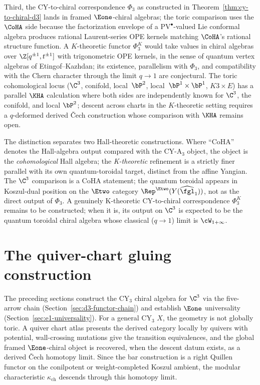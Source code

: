 \begin{remark}
Third, the CY-to-chiral correspondence $\Phi_3$ as constructed in Theorem~\ref{thm:cy-to-chiral-d3} lands in framed $\Eone$-chiral algebras; the toric comparison uses the $\CoHA$ side because the factorization envelope of a $\mathrm{PV}^\bullet$-valued Lie conformal algebra produces rational Laurent-series OPE kernels matching $\CoHA$'s rational structure function. A $K$-theoretic functor $\Phi_3^K$ would take values in chiral algebras over $\Z[q^{\pm 1}, t^{\pm 1}]$ with trigonometric OPE kernels, in the sense of quantum vertex algebras of Etingof--Kazhdan; its existence, parallelism with $\Phi_3$, and compatibility with the Chern character through the limit $q \to 1$ are conjectural. The toric cohomological locus ($\C^3$, conifold, local~$\bP^2$, local~$\bP^1 \times \bP^1$, $K3 \times E$) has a parallel $\KHA$ calculation where both sides are independently known for $\C^3$, the conifold, and local $\bP^2$; descent across charts in the $K$-theoretic setting requires a $q$-deformed derived Čech construction whose comparison with $\KHA$ remains open.

The distinction separates two Hall-theoretic constructions. Where ``CoHA'' denotes the Hall-algebra output compared with the CY-A$_3$ object, the object is the \emph{cohomological} Hall algebra; the \emph{K-theoretic} refinement is a strictly finer parallel with its own quantum-toroidal target, distinct from the affine Yangian. The $\C^3$ comparison is a CoHA statement; the quantum toroidal appears in Koszul-dual position on the $\Etwo$ category $\Rep^{\Etwo}(Y(\widehat{\fgl}_1))$, not as the direct output of $\Phi_3$. A genuinely K-theoretic CY-to-chiral correspondence $\Phi_3^K$ remains to be constructed; when it is, its output on $\C^3$ is expected to be the quantum toroidal chiral algebra whose classical ($q \to 1$) limit is $\cW_{1 + \infty}$.
\end{remark}


\section{The quiver-chart gluing construction}
\label{sec:quiver-chart-gluing}

The preceding sections construct the CY$_3$ chiral algebra for $\C^3$ via the five-arrow chain (Section~\ref{sec:d3-functor-chain}) and establish $\Eone$ universality (Section~\ref{sec:e1-universality}). For a general CY$_3$ $X$, the geometry is not globally toric. A quiver chart atlas presents the derived category locally by quivers with potential, wall-crossing mutations give the transition equivalences, and the global framed $\Eone$-chiral object is recovered, when the descent datum exists, as a derived Čech homotopy limit. Since the bar construction is a right Quillen functor on the conilpotent or weight-completed Koszul ambient, the modular characteristic $\kappa_{\mathrm{ch}}$ descends through this homotopy limit.

